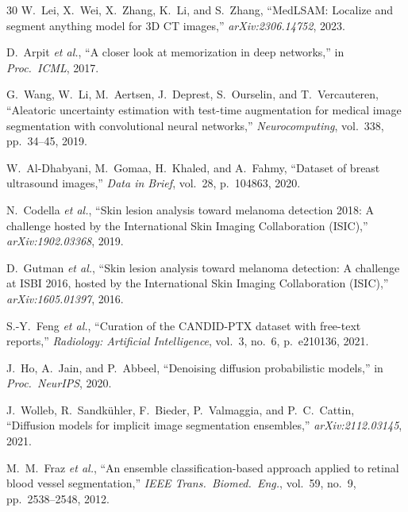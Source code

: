 \documentclass[journal,11pt,onecolumn,draftclsnofoot]{IEEEtran}
\begin{document}
\begin{thebibliography}{30}
W.~Lei, X.~Wei, X.~Zhang, K.~Li, and S.~Zhang, ``MedLSAM: Localize and segment anything model for 3D CT images,'' \emph{arXiv:2306.14752}, 2023.

D.~Arpit \emph{et al.}, ``A closer look at memorization in deep networks,'' in \emph{Proc.\ ICML}, 2017.

G.~Wang, W.~Li, M.~Aertsen, J.~Deprest, S.~Ourselin, and T.~Vercauteren, ``Aleatoric uncertainty estimation with test-time augmentation for medical image segmentation with convolutional neural networks,'' \emph{Neurocomputing}, vol.~338, pp.~34--45, 2019.

W.~Al-Dhabyani, M.~Gomaa, H.~Khaled, and A.~Fahmy, ``Dataset of breast ultrasound images,'' \emph{Data in Brief}, vol.~28, p.~104863, 2020.

N.~Codella \emph{et al.}, ``Skin lesion analysis toward melanoma detection 2018: A challenge hosted by the International Skin Imaging Collaboration (ISIC),'' \emph{arXiv:1902.03368}, 2019.

D.~Gutman \emph{et al.}, ``Skin lesion analysis toward melanoma detection: A challenge at ISBI 2016, hosted by the International Skin Imaging Collaboration (ISIC),'' \emph{arXiv:1605.01397}, 2016.

S.-Y.~Feng \emph{et al.}, ``Curation of the CANDID-PTX dataset with free-text reports,'' \emph{Radiology: Artificial Intelligence}, vol.~3, no.~6, p.~e210136, 2021.

J.~Ho, A.~Jain, and P.~Abbeel, ``Denoising diffusion probabilistic models,'' in \emph{Proc.\ NeurIPS}, 2020.

J.~Wolleb, R.~Sandk{\"u}hler, F.~Bieder, P.~Valmaggia, and P.~C.~Cattin, ``Diffusion models for implicit image segmentation ensembles,'' \emph{arXiv:2112.03145}, 2021.

M.~M.~Fraz \emph{et al.}, ``An ensemble classification-based approach applied to retinal blood vessel segmentation,'' \emph{IEEE Trans.\ Biomed.\ Eng.}, vol.~59, no.~9, pp.~2538--2548, 2012.

\end{thebibliography}
\end{document}
